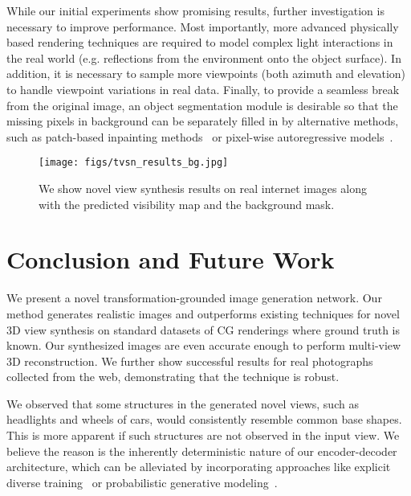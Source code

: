 \documentclass[10pt,twocolumn,letterpaper]{article}
\begin{document}
While our initial experiments show promising results, further investigation is necessary to improve performance. Most importantly, more advanced physically based rendering techniques are required to model complex light interactions in the real world (e.g. reflections from the environment onto the object surface). In addition, it is necessary to sample more viewpoints (both azimuth and elevation) to handle viewpoint variations in real data. 
Finally, to provide a seamless break from the original image, an object segmentation module is desirable so that the missing pixels in background can be separately filled in by alternative methods, such as patch-based inpainting methods~\cite{barnes_siggraph2009} or pixel-wise autoregressive models~\cite{van2016pixel}.

\begin{figure}[t]
\vspace{-2mm}
\begin{center}
\texttt{[image: figs/tvsn\_results\_bg.jpg]}
\end{center}
\caption{We show novel view synthesis results on real internet images along with the predicted visibility map and the background mask.}
\label{fig:tvsn_results_bg}
\vspace{-2mm}
\end{figure}

\section{Conclusion and Future Work}
We present a novel transformation-grounded image generation network. Our method generates realistic images and outperforms existing techniques for novel 3D view synthesis on standard datasets of CG renderings where ground truth is known. Our synthesized images are even accurate enough to perform multi-view 3D reconstruction.  We further show successful results for real photographs collected from the web, demonstrating that the technique is robust.

We observed that some structures in the generated novel views, such as headlights and wheels of cars, would consistently resemble common base shapes. This is more apparent if such structures are not observed in the input view. We believe the reason is the inherently deterministic nature of our encoder-decoder architecture, which can be alleviated by incorporating approaches like explicit diverse training~\cite{lee_nips2016} or probabilistic generative modeling~\cite{Xue_nips2016,Yan_eccv2016,mizra_arxiv2014,walker_eccv2016}.
\end{document}
